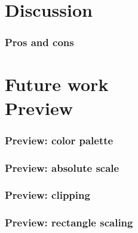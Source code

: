 \documentclass{beamer}
\begin{document}

\section{Discussion}

\begin{frame}
  \frametitle{Pros and cons}

  
\end{frame}


\section{Future work \\ \small{Preview}}

\begin{frame}
  \frametitle{Preview: color palette}

  
\end{frame}

\begin{frame}
  \frametitle{Preview: absolute scale}

  
\end{frame}

\begin{frame}
  \frametitle{Preview: clipping}

  
\end{frame}

\begin{frame}
  \frametitle{Preview: rectangle scaling}

  
\end{frame}
\end{document}
